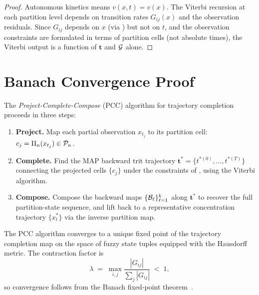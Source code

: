 \begin{proof}
Autonomous kinetics means $v(x,t) = v(x)$.  The Viterbi recursion at each
partition level depends on transition rates $G_{ij}(x)$ and the observation
residuals.  Since $G_{ij}$ depends on $x$ (via ) but not
on $t$, and the observation constraints are formulated in terms of partition
cells (not absolute times), the Viterbi output is a function of $\mathbf{t}$
and $\mathcal{G}$ alone.
\end{proof}

\section{Banach Convergence Proof}
\label{sec:banach}

\begin{definition}
\label{def:pcc}
The \emph{Project-Complete-Compose} (PCC) algorithm for trajectory completion
proceeds in three steps:
\begin{enumerate}[label=\textbf{Step \arabic*:}, leftmargin=*, itemsep=4pt]
    \item \textbf{Project.}  Map each partial observation $x_{t_j}$ to its
          partition cell: $c_j = \Pi_n(x_{t_j}) \in \mathcal{P}_n$.
    \item \textbf{Complete.}  Find the MAP backward trit trajectory
          $\mathbf{t}^* = \{t^{*(0)}, \ldots, t^{*(T)}\}$ connecting the
          projected cells $\{c_j\}$ under the constraints of
          , using the Viterbi algorithm.
    \item \textbf{Compose.}  Compose the backward maps
          $\{\mathcal{B}_\ell\}_{\ell=1}^k$ along $\mathbf{t}^*$ to recover the
          full partition-state sequence, and lift back to a representative
          concentration trajectory $\{x_t^*\}$ via the inverse partition map.
\end{enumerate}
\end{definition}

\begin{theorem}
\label{thm:pcc-convergence}
The PCC algorithm converges to a unique fixed point of the trajectory
completion map on the space of fuzzy state tuples equipped with the Hausdorff
metric.  The contraction factor is
\begin{equation}
    \lambda
    \;=\;
    \max_{i,j}\frac{|G_{ij}|}{\sum_j |G_{ij}|}
    \;<\; 1,
    \label{eq:contraction}
\end{equation}
so convergence follows from the Banach fixed-point theorem~\citep{Banach1922}.
\end{theorem}

